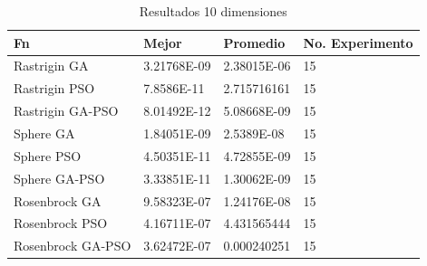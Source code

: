 \documentclass[runningheads]{llncs}
\begin{document}
        \begin{table}[htp]
          \caption{Resultados 10 dimensiones}
          \label{table:resultados-2}
          \centering
          \begin{tabular}{|l|l|l|l|}
          \hline
          Fn & Mejor & Promedio & No. Experimento \\
          \hline
          \hline
          Rastrigin GA & 3.21768E-09 & 2.38015E-06 & 15\\
          \hline
          Rastrigin PSO & 7.8586E-11 & 2.715716161 & 15\\
          \hline
          Rastrigin GA-PSO & 8.01492E-12 & 5.08668E-09 & 15\\
          \hline
          Sphere GA & 1.84051E-09 & 2.5389E-08 & 15\\
          \hline
          Sphere PSO & 4.50351E-11 & 4.72855E-09 & 15\\
          \hline
          Sphere GA-PSO & 3.33851E-11 & 1.30062E-09 & 15\\
          \hline
          Rosenbrock GA & 9.58323E-07 & 1.24176E-08 & 15\\
          \hline
          Rosenbrock PSO & 4.16711E-07 & 4.431565444 & 15\\
          \hline
          Rosenbrock GA-PSO & 3.62472E-07 & 0.000240251 & 15\\
          \hline
          \end{tabular}
          \end{table}
\end{document}
